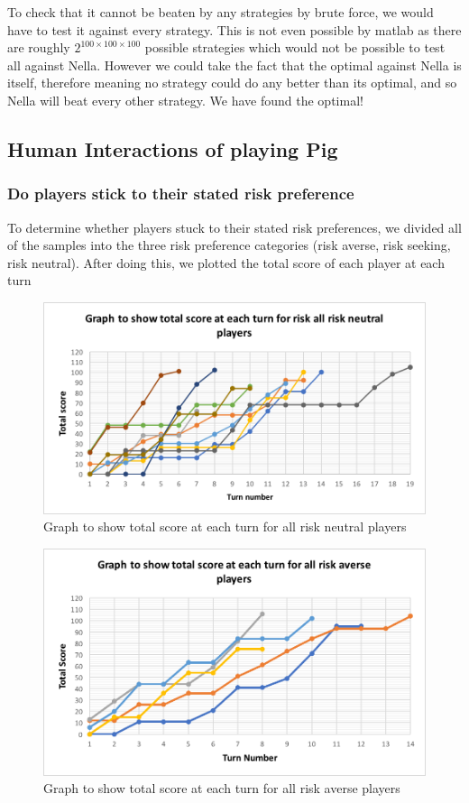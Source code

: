 \documentclass[a4paper,titlepage]{article}
\begin{document}
To check that it cannot be beaten by any strategies by brute force, we would have to test it against every strategy. This is not even possible by matlab as there are roughly $2^{100\times100\times100}$ possible strategies which would not be possible to test all against Nella. However we could take the fact that the optimal against Nella is itself, therefore meaning no strategy could do any better than its optimal, and so Nella will beat every other strategy. We have found the optimal!

\subsection{Human Interactions of playing Pig}
\subsubsection{Do players stick to their stated risk preference}
To determine whether players stuck to their stated risk preferences, we divided all of the samples into the three risk preference categories (risk averse, risk seeking, risk neutral). After doing this, we plotted the total score of each player at each turn
\begin{figure}
\center
\includegraphics[scale=1]{neutral_graph}
\caption{Graph to show total score at each turn for all risk neutral players\label{figure7}}
\end{figure}
\begin{figure}
\center
\includegraphics[scale=1]{averse_graph}
\caption{Graph to show total score at each turn for all risk averse players\label{figure8}}
\end{figure}
\end{document}
